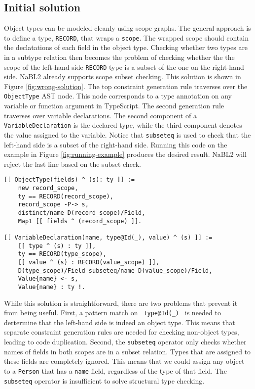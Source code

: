\subsection{Initial solution}
Object types can be modeled cleanly using scope graphs. 
The general approach is to define a type, \texttt{RECORD}, that wraps a \texttt{scope}.
The wrapped scope should contain the declatations of each field in the object type.
Checking whether two types are in a subtype relation then becomes the problem of checking whether
the the scope of the left-hand side \texttt{RECORD} type is a subset of the one on the right-hand side.
NaBL2 already supports scope subset checking.
This solution is shown in Figure \ref{fig:wrong-solution}.
The top constraint generation rule traverses over the \texttt{ObjectType} AST node.
This node corresponds to a type annotation on any variable or function argument in TypeScript.
The second generation rule traverses over variable declarations.
The second component of a \texttt{VariableDeclaration} is the declared type, 
while the third component denotes the value assigned to the variable.
Notice that \texttt{subseteq} is used to check that the left-hand side is a subset of the right-hand side.
Running this code on the example in Figure \ref{fig:running-example} produces the desired result.
NaBL2 will reject the last line based on the subset check.
\begin{figure*}[h]
\begin{lstlisting}
[[ ObjectType(fields) ^ (s): ty ]] :=
    new record_scope,
    ty == RECORD(record_scope),
    record_scope -P-> s,
    distinct/name D(record_scope)/Field,
    Map1 [[ fields ^ (record_scope) ]].

[[ VariableDeclaration(name, type@Id(_), value) ^ (s) ]] :=
    [[ type ^ (s) : ty ]],
    ty == RECORD(type_scope),
    [[ value ^ (s) : RECORD(value_scope) ]],
    D(type_scope)/Field subseteq/name D(value_scope)/Field,
    Value{name} <- s,
    Value{name} : ty !.
\end{lstlisting}
\caption{Naive solution to object type checking.}
\label{fig:wrong-solution}
\end{figure*}

While this solution is straightforward, there are two problems that prevent it from being useful.
First, a pattern match on \texttt{ type@Id(\_) } is needed to dertermine that the left-hand side is indeed an object type. 
This means that separate constraint generation rules are needed for checking non-object types, leading to code duplication.
Second, the \texttt{subseteq} operator only checks whether names of fields in both scopes are in a subset relation.
Types that are assigned to these fields are completely ignored.
This means that we could assign any object to a \texttt{Person} that has a \texttt{name} field, 
regardless of the type of that field.
The \texttt{subseteq} operator is insufficient to solve structural type checking.

